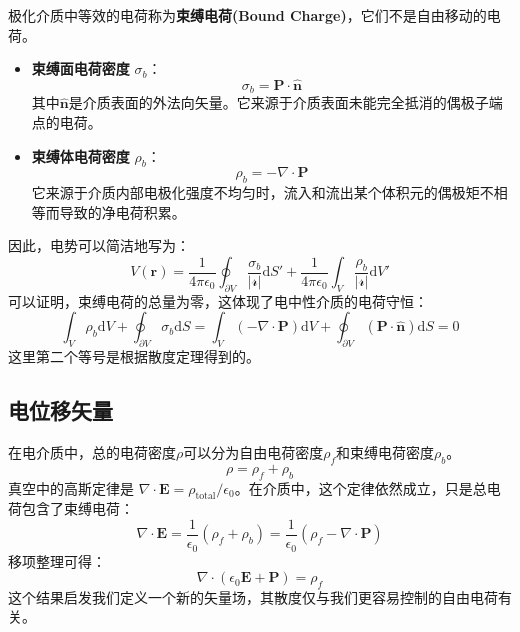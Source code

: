 \documentclass[fontset=none]{ctexart}
\begin{document}
\begin{definition}[束缚电荷]
    极化介质中等效的电荷称为\textbf{束缚电荷(Bound Charge)}，它们不是自由移动的电荷。
    \begin{itemize}
        \item \textbf{束缚面电荷密度} $\sigma_b$：
        \begin{equation}
            \sigma_b = \bm{P} \cdot \hat{\bm{n}}
        \end{equation}
        其中$\hat{\bm{n}}$是介质表面的外法向矢量。它来源于介质表面未能完全抵消的偶极子端点的电荷。
        \item \textbf{束缚体电荷密度} $\rho_b$：
        \begin{equation}
            \rho_b = -\nabla \cdot \bm{P}
        \end{equation}
        它来源于介质内部电极化强度不均匀时，流入和流出某个体积元的偶极矩不相等而导致的净电荷积累。
    \end{itemize}
\end{definition}
因此，电势可以简洁地写为：
\begin{equation}
    V(\bm{r}) = \frac{1}{4\pi\epsilon_0} \oint_{\partial V} \frac{\sigma_b}{|\bm{\mathscr{r}}|} \mathrm{d}S' + \frac{1}{4\pi\epsilon_0} \int_V \frac{\rho_b}{|\bm{\mathscr{r}}|} \mathrm{d}V'
\end{equation}
可以证明，束缚电荷的总量为零，这体现了电中性介质的电荷守恒：
\begin{equation}
    \int_V \rho_b \mathrm{d}V + \oint_{\partial V} \sigma_b \mathrm{d}S = \int_V (-\nabla \cdot \bm{P}) \mathrm{d}V + \oint_{\partial V} (\bm{P} \cdot \hat{\bm{n}}) \mathrm{d}S = 0
\end{equation}
这里第二个等号是根据散度定理得到的。

\subsection{电位移矢量}
在电介质中，总的电荷密度$\rho$可以分为自由电荷密度$\rho_f$和束缚电荷密度$\rho_b$。
\begin{equation}
    \rho = \rho_f + \rho_b
\end{equation}
真空中的高斯定律是 $\nabla \cdot \bm{E} = \rho_{\text{total}} / \epsilon_0$。在介质中，这个定律依然成立，只是总电荷包含了束缚电荷：
\begin{equation}
    \nabla \cdot \bm{E} = \frac{1}{\epsilon_0} (\rho_f + \rho_b) = \frac{1}{\epsilon_0} (\rho_f - \nabla \cdot \bm{P})
\end{equation}
移项整理可得：
\begin{equation}
    \nabla \cdot (\epsilon_0 \bm{E} + \bm{P}) = \rho_f
\end{equation}
这个结果启发我们定义一个新的矢量场，其散度仅与我们更容易控制的自由电荷有关。
\end{document}
